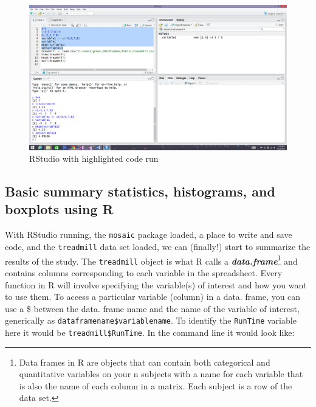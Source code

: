 \documentclass[]{article}
\newenvironment{Shaded}{\begin{snugshade}}{\end{snugshade}}
\newcommand{\NormalTok}[1]{{#1}}
\let\rmarkdownfootnote\footnote%
\def\footnote{\protect\rmarkdownfootnote}
\begin{document}
\begin{figure}
\includegraphics[width=26.67in]{chapter0_files/image006} \caption{RStudio with highlighted code run}\label{fig:Figure4}
\end{figure}

\subsection{Basic summary statistics, histograms, and boxplots using
R}\label{basic-summary-statistics-histograms-and-boxplots-using-r}

With RStudio running, the \texttt{mosaic} package loaded, a place to
write and save code, and the \texttt{treadmill} data set loaded, we can
(finally!) start to summarize the results of the study. The
\texttt{treadmill} object is what R calls a
\textbf{\emph{data.frame}}\footnote{Data frames in R are objects that
  can contain both categorical and quantitative variables on your n
  subjects with a name for each variable that is also the name of each
  column in a matrix. Each subject is a row of the data set.} and
contains columns corresponding to each variable in the spreadsheet.
Every function in R will involve specifying the variable(s) of interest
and how you want to use them. To access a particular variable (column)
in a data. frame, you can use a \$ between the data. frame name and the
name of the variable of interest, generically as
\texttt{dataframename\$variablename}. To identify the \texttt{RunTime}
variable here it would be \texttt{treadmill\$RunTime}. In the command
line it would look like:

\begin{Shaded}
\end{Shaded}
\end{document}
